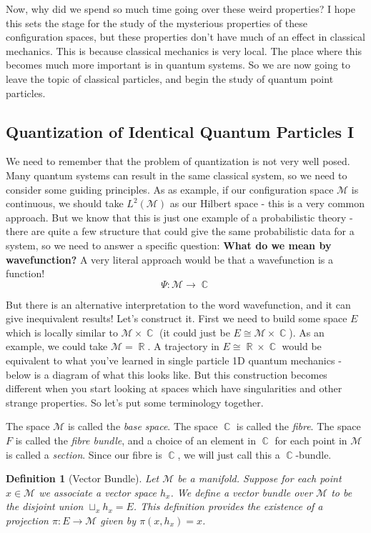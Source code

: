 \documentclass{article}
\DeclareMathOperator{\RR}{\mathbb{R}}
\DeclareMathOperator{\CC}{\mathbb{C}}
\newtheorem{defn}{Definition}
\begin{document}
Now, why did we spend so much time going over these weird properties? I hope this sets the stage for the study of the mysterious properties of these configuration spaces, but these properties don't have much of an effect in classical mechanics. This is because classical mechanics is very local. The place where this becomes much more important is in quantum systems. So we are now going to leave the topic of classical particles, and begin the study of quantum point particles.

\subsection{Quantization of Identical Quantum Particles I}

We need to remember that the problem of quantization is not very well posed. Many quantum systems can result in the same classical system, so we need to consider some guiding principles. As as example, if our configuration space $\mathcal{M}$ is continuous, we should take $L^2(\mathcal{M})$ as our Hilbert space - this is a very common approach. But we know that this is just one example of a probabilistic theory - there are quite a few structure that could give the same probabilistic data for a system, so we need to answer a specific question: \textbf{What do we mean by wavefunction?} A very literal approach would be that a wavefunction is a function! 
\[\Psi: \mathcal{M} \to \CC\]

But there is an alternative interpretation to the word wavefunction, and it can give inequivalent results! Let's construct it. First we need to build some space $E$ which is locally similar to $\mathcal{M} \times \CC$ (it could just be $E \cong \mathcal{M}\times \CC$). As an example, we could take $\mathcal{M} = \RR$. A trajectory in $E \cong \RR \times \CC$ would be equivalent to what you've learned in single particle 1D quantum mechanics - below is a diagram of what this looks like. But this construction becomes different when you start looking at spaces which have singularities and other strange properties. So let's put some terminology together.

The space $\mathcal{M}$ is called the \textit{base space}. The space $\CC$ is called the \textit{fibre}. The space $F$ is called the \textit{fibre bundle}, and a choice of an element in $\CC$ for each point in $\mathcal{M}$ is called a \textit{section}. Since our fibre is $\CC$, we will just call this a $\CC$-bundle.

\begin{defn}[Vector Bundle]
Let $\mathcal{M}$ be a manifold. Suppose for each point $x \in \mathcal{M}$ we associate a vector space $h_x$. We define a vector bundle over $\mathcal{M}$ to be the disjoint union $\sqcup_x h_x = E$. This definition provides the existence of a projection $\pi : E \to \mathcal{M}$ given by $\pi(x,h_x)=x$.
\end{defn}
\end{document}
